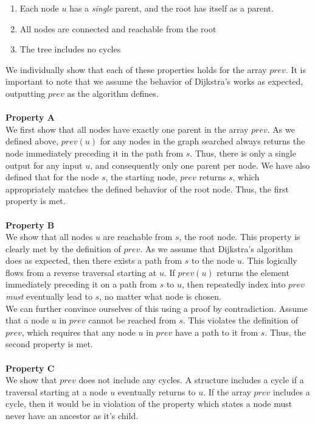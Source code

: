 \documentclass{article}
\begin{document}
\begin{enumerate}
\begin{enumerate}
\item Each node $u$ has a \emph{single} parent, and the root has itself as a parent.
\item All nodes are connected and reachable from the root
\item The tree includes no cycles
\end{enumerate}
We individually show that each of these properties holds for the array $prev$. It is important to note that we assume the behavior of Dijkstra's works as expected, outputting $prev$ as the algorithm defines.
\\ \\ \textbf{Property A}
\\ We first show that all nodes have exactly one parent in the array $prev$. As we defined above, $prev(u)$ for any nodes in the graph searched always returns the node immediately preceding it in the path from $s$. Thus, there is only a single output for any input $u$, and consequently only one parent per node. We have also defined that for the node $s$, the starting node, $prev$ returns $s$, which appropriately matches the defined behavior of the root node. Thus, the first property is met.
\\ \\ \textbf{Property B}
\\ We show that all nodes $u$ are reachable from $s$, the root node. This property is clearly met by the definition of $prev$. As we assume that Dijkstra's algorithm does as expected, then there exists a path from $s$ to the node $u$. This logically flows from a reverse traversal starting at $u$. If $prev(u)$ returns the element immediately preceding it on a path from $s$ to $u$, then repeatedly index into $prev$ \emph{must} eventually lead to $s$, no matter what node is chosen.  
\\ We can further convince ourselves of this using a proof by contradiction. Assume that a node $u$ in $prev$ cannot be reached from $s$. This violates the definition of $prev$, which requires that any node $u$ in $prev$ have a path to it from $s$. Thus, the second property is met.
\\ \\ \textbf{Property C}
\\ We show that $prev$ does not include any cycles. A structure includes a cycle if a traversal starting at a node $u$ eventually returns to $u$. If the array $prev$ includes a cycle, then it would be in violation of the property which states a node must never have an ancestor as it's child.

\end{enumerate}
\end{document}

